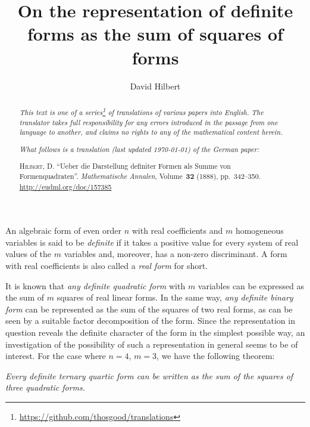 \documentclass{article}
\title{On the representation of definite forms as the sum of squares of forms}
\author{David Hilbert}
\date{}
\newcommand{\oldpage}[1]{\marginpar{\footnotesize$\Big\vert$ \textit{p.~#1}}}
\begin{document}
\maketitle
\thispagestyle{fancy}

\renewcommand{\abstractname}{Translator's note.}

\begin{abstract}
  \renewcommand*{\thefootnote}{\fnsymbol{footnote}}
  \emph{This text is one of a series\footnote{\url{https://github.com/thosgood/translations}} of translations of various papers into English.}
  \emph{The translator takes full responsibility for any errors introduced in the passage from one language to another, and claims no rights to any of the mathematical content herein.}
  
  \emph{What follows is a translation (last updated \today) of the German paper:}

  \medskip\noindent
  \textsc{Hilbert, D.}
  ``Ueber die Darstellung definiter Formen als Summe von Formenquadraten''.
  \emph{Mathematische Annalen}, Volume~\textbf{32} (1888), pp.~342--350.
  {\footnotesize\url{http://eudml.org/doc/157385}}
\end{abstract}

\setcounter{footnote}{0}
\renewcommand{\thefootnote}{\fnsymbol{footnote}}



\oldpage{342}

An algebraic form of even order $n$ with real coefficients and $m$ homogeneous variables is said to be \emph{definite} if it takes a positive value for every system of real values of the $m$ variables and, moreover, has a non-zero discriminant.
A form with real coefficients is also called a \emph{real form} for short.

It is known that \emph{any definite quadratic form} with $m$ variables can be expressed as the sum of $m$ squares of real linear forms.
In the same way, \emph{any definite binary form} can be represented as the sum of the squares of two real forms, as can be seen by a suitable factor decomposition of the form.
Since the representation in question reveals the definite character of the form in the simplest possible way, an investigation of the possibility of such a representation in general seems to be of interest.
For the case where $n=4$, $m=3$, we have the following theorem:

\emph{Every definite ternary quartic form can be written as the sum of the squares of three quadratic forms.}
\end{document}
